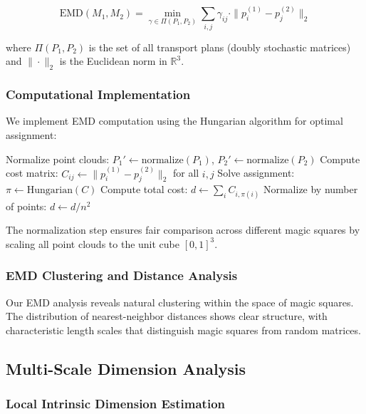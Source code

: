 \begin{equation}
\text{EMD}(M_1, M_2) = \min_{\gamma \in \Pi(P_1, P_2)} \sum_{i,j} \gamma_{ij} \cdot \|p_i^{(1)} - p_j^{(2)}\|_2
\end{equation}

where $\Pi(P_1, P_2)$ is the set of all transport plans (doubly stochastic matrices) and $\|\cdot\|_2$ is the Euclidean norm in $\mathbb{R}^3$.

\subsubsection{Computational Implementation}

We implement EMD computation using the Hungarian algorithm for optimal assignment:

\begin{algorithm}[H]
\caption{Earth Mover's Distance Computation}
Normalize point clouds: $P_1' \leftarrow \text{normalize}(P_1)$, $P_2' \leftarrow \text{normalize}(P_2)$\;
Compute cost matrix: $C_{ij} \leftarrow \|p_i^{(1)} - p_j^{(2)}\|_2$ for all $i,j$\;
Solve assignment: $\pi \leftarrow \text{Hungarian}(C)$\;
Compute total cost: $d \leftarrow \sum_{i} C_{i,\pi(i)}$\;
Normalize by number of points: $d \leftarrow d / n^2$\;
\end{algorithm}

The normalization step ensures fair comparison across different magic squares by scaling all point clouds to the unit cube $[0,1]^3$.

\subsubsection{EMD Clustering and Distance Analysis}

Our EMD analysis reveals natural clustering within the space of magic squares. The distribution of nearest-neighbor distances shows clear structure, with characteristic length scales that distinguish magic squares from random matrices.



\subsection{Multi-Scale Dimension Analysis}

\subsubsection{Local Intrinsic Dimension Estimation}

